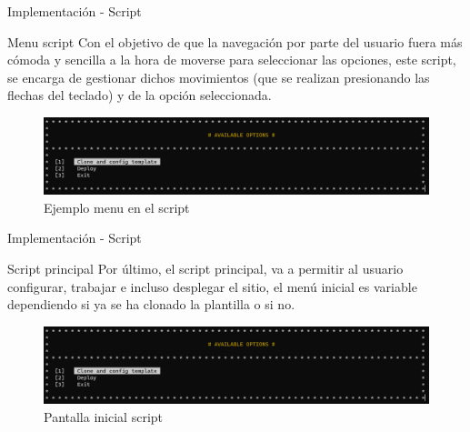 \documentclass{beamer}
\begin{document}
    \begin{frame}{Implementación - Script}
    
        \begin{block}{Menu script}
            Con el objetivo de que la navegación por parte del usuario fuera más cómoda y sencilla a la hora de moverse para seleccionar las opciones, este script, se encarga de gestionar dichos movimientos (que se realizan presionando las flechas del teclado) y de la opción seleccionada.
            
        \end{block}

        \begin{center}  
            \begin{figure}
                \includegraphics[width=.9\textwidth]{Presentacion/implementacion/script/home.png}
                \caption{Ejemplo menu en el script}
            \end{figure}            
        \end{center}
        
        
    \end{frame}  

    \begin{frame}{Implementación - Script}
    
        \begin{block}{Script principal}
            Por último, el script principal, va a permitir al usuario configurar, trabajar e incluso desplegar el sitio, el menú inicial es variable dependiendo si ya se ha clonado la plantilla o si no.            
        \end{block}

        \begin{center}  
            \begin{figure}
                \includegraphics[width=.9\textwidth]{Presentacion/implementacion/script/home.png}
                \caption{Pantalla inicial script}
            \end{figure}            
        \end{center}
        
        
    \end{frame}  
\end{document}
